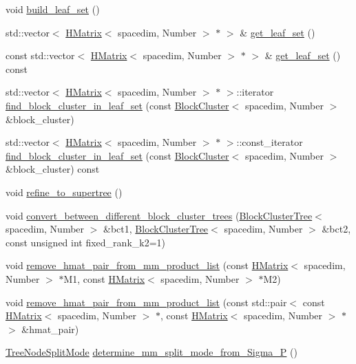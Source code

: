 \begin{DoxyCompactItemize}
\item 
void \hyperlink{classHMatrix_a139f32982527ba981e0211b5663e3b43}{build\+\_\+leaf\+\_\+set} ()
\item 
std\+::vector$<$ \hyperlink{classHMatrix}{H\+Matrix}$<$ spacedim, Number $>$ $\ast$ $>$ \& \hyperlink{classHMatrix_ac5c9102fc04997c1ae3627185379d9bb}{get\+\_\+leaf\+\_\+set} ()
\item 
const std\+::vector$<$ \hyperlink{classHMatrix}{H\+Matrix}$<$ spacedim, Number $>$ $\ast$ $>$ \& \hyperlink{classHMatrix_a851d7bb3632bc1d18538d4d1dd5f6393}{get\+\_\+leaf\+\_\+set} () const
\item 
std\+::vector$<$ \hyperlink{classHMatrix}{H\+Matrix}$<$ spacedim, Number $>$ $\ast$ $>$\+::iterator \hyperlink{classHMatrix_ab0f83de878e6079330ec3c374f587a04}{find\+\_\+block\+\_\+cluster\+\_\+in\+\_\+leaf\+\_\+set} (const \hyperlink{classBlockCluster}{Block\+Cluster}$<$ spacedim, Number $>$ \&block\+\_\+cluster)
\item 
std\+::vector$<$ \hyperlink{classHMatrix}{H\+Matrix}$<$ spacedim, Number $>$ $\ast$ $>$\+::const\+\_\+iterator \hyperlink{classHMatrix_a723cc200afe31148fcc28f0120c5ec54}{find\+\_\+block\+\_\+cluster\+\_\+in\+\_\+leaf\+\_\+set} (const \hyperlink{classBlockCluster}{Block\+Cluster}$<$ spacedim, Number $>$ \&block\+\_\+cluster) const
\item 
void \hyperlink{classHMatrix_ad2b353962226c78910d6ddb6b5b8e460}{refine\+\_\+to\+\_\+supertree} ()
\item 
void \hyperlink{classHMatrix_af6fd60090b0de7bdea52fc84ddeb22c3}{convert\+\_\+between\+\_\+different\+\_\+block\+\_\+cluster\+\_\+trees} (\hyperlink{classBlockClusterTree}{Block\+Cluster\+Tree}$<$ spacedim, Number $>$ \&bct1, \hyperlink{classBlockClusterTree}{Block\+Cluster\+Tree}$<$ spacedim, Number $>$ \&bct2, const unsigned int fixed\+\_\+rank\+\_\+k2=1)
\item 
void \hyperlink{classHMatrix_a9e023f39b1f8916117a63557895a91b4}{remove\+\_\+hmat\+\_\+pair\+\_\+from\+\_\+mm\+\_\+product\+\_\+list} (const \hyperlink{classHMatrix}{H\+Matrix}$<$ spacedim, Number $>$ $\ast$M1, const \hyperlink{classHMatrix}{H\+Matrix}$<$ spacedim, Number $>$ $\ast$M2)
\item 
void \hyperlink{classHMatrix_ae0ab9b3be4ea0ef959da40e81313b2e3}{remove\+\_\+hmat\+\_\+pair\+\_\+from\+\_\+mm\+\_\+product\+\_\+list} (const std\+::pair$<$ const \hyperlink{classHMatrix}{H\+Matrix}$<$ spacedim, Number $>$ $\ast$, const \hyperlink{classHMatrix}{H\+Matrix}$<$ spacedim, Number $>$ $\ast$$>$ \&hmat\+\_\+pair)
\item 
\hyperlink{tree_8h_a922ca07db9633957939f697a65aff11d}{Tree\+Node\+Split\+Mode} \hyperlink{classHMatrix_a6f24998c7de1d0e336577be41c6281e3}{determine\+\_\+mm\+\_\+split\+\_\+mode\+\_\+from\+\_\+\+Sigma\+\_\+P} ()
\end{DoxyCompactItemize}
